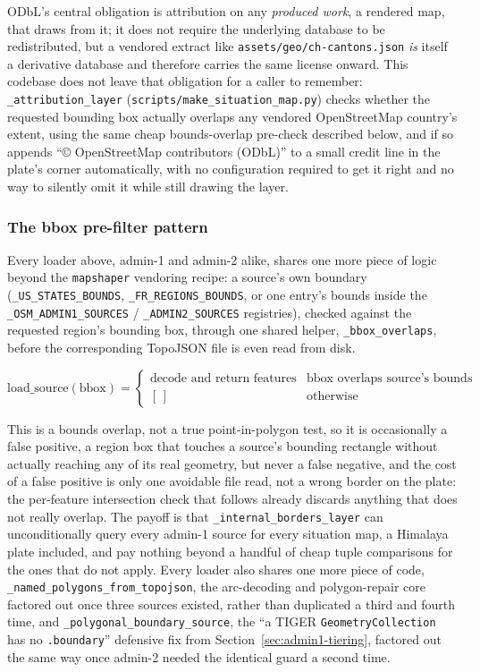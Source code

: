\documentclass[11pt]{article}
\begin{document}
ODbL's central obligation is attribution on any \emph{produced work},
a rendered map, that draws from it; it does not require the underlying
database to be redistributed, but a vendored extract like
\texttt{assets/geo/ch-cantons.json} \emph{is} itself a derivative
database and therefore carries the same license onward. This codebase
does not leave that obligation for a caller to remember:
\texttt{\_attribution\_layer}
(\texttt{scripts/make\_situation\_map.py}) checks whether the requested
bounding box actually overlaps any vendored OpenStreetMap country's
extent, using the same cheap bounds-overlap pre-check described below,
and if so appends ``© OpenStreetMap contributors (ODbL)'' to a small
credit line in the plate's corner automatically, with no configuration
required to get it right and no way to silently omit it while still
drawing the layer.

\subsubsection{The bbox pre-filter pattern}

Every loader above, admin-1 and admin-2 alike, shares one more piece
of logic beyond the \texttt{mapshaper} vendoring recipe: a source's own
boundary (\texttt{\_US\_STATES\_BOUNDS}, \texttt{\_FR\_REGIONS\_BOUNDS},
or one entry's bounds inside the \texttt{\_OSM\_ADMIN1\_SOURCES} /
\texttt{\_ADMIN2\_SOURCES} registries), checked against the requested
region's bounding box, through one shared helper,
\texttt{\_bbox\_overlaps}, before the corresponding TopoJSON file is
even read from disk.

\[
\text{load\_source}(\text{bbox}) =
\begin{cases}
\text{decode and return features} & \text{bbox overlaps source's bounds} \\
[\,] & \text{otherwise}
\end{cases}
\]

This is a bounds overlap, not a true point-in-polygon test, so it is
occasionally a false positive, a region box that touches a source's
bounding rectangle without actually reaching any of its real
geometry, but never a false negative, and the cost of a false positive
is only one avoidable file read, not a wrong border on the plate: the
per-feature intersection check that follows already discards anything
that does not really overlap. The payoff is that
\texttt{\_internal\_borders\_layer} can unconditionally query every
admin-1 source for every situation map, a Himalaya plate included, and
pay nothing beyond a handful of cheap tuple comparisons for the ones
that do not apply. Every loader also shares one more piece of code,
\texttt{\_named\_polygons\_from\_topojson}, the arc-decoding and
polygon-repair core factored out once three sources existed, rather
than duplicated a third and fourth time, and
\texttt{\_polygonal\_boundary\_source}, the ``a TIGER
\texttt{GeometryCollection} has no \texttt{.boundary}'' defensive fix
from Section~\ref{sec:admin1-tiering}, factored out the same way once
admin-2 needed the identical guard a second time.
\end{document}
